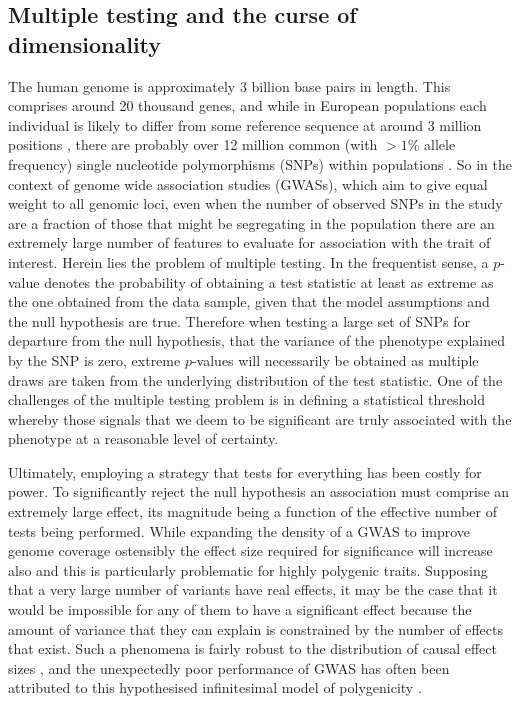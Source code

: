 \subsection{Multiple testing and the curse of dimensionality}

The human genome is approximately 3 billion base pairs in length. This comprises around 20 thousand genes, and while in European populations each individual is likely to differ from some reference sequence at around 3 million positions \citep{Durbin2010}, there are probably over 12 million common (with $>1\%$ allele frequency) single nucleotide polymorphisms (SNPs) within populations \citep{Altshuler2010}. So in the context of genome wide association studies (GWASs), which aim to give equal weight to all genomic loci, even when the number of observed SNPs in the study are a fraction of those that might be segregating in the population there are an extremely large number of features to evaluate for association with the trait of interest. Herein lies the problem of multiple testing. In the frequentist sense, a $p$-value denotes the probability of obtaining a test statistic at least as extreme as the one obtained from the data sample, given that the model assumptions and the null hypothesis are true. Therefore when testing a large set of SNPs for departure from the null hypothesis, that the variance of the phenotype explained by the SNP is zero, extreme $p$-values will necessarily be obtained as multiple draws are taken from the underlying distribution of the test statistic. One of the challenges of the multiple testing problem is in defining a statistical threshold whereby those signals that we deem to be significant are truly associated with the phenotype at a reasonable level of certainty.

Ultimately, employing a strategy that tests for everything has been costly for power. To significantly reject the null hypothesis an association must comprise an extremely large effect, its magnitude being a function of the effective number of tests being performed. While expanding the density of a GWAS to improve genome coverage ostensibly the effect size required for significance will increase also and this is particularly problematic for highly polygenic traits. Supposing that a very large number of variants have real effects, it may be the case that it would be impossible for any of them to have a significant effect because the amount of variance that they can explain is constrained by the number of effects that exist. Such a phenomena is fairly robust to the distribution of causal effect sizes \citep{Daetwyler2008}, and the unexpectedly poor performance of GWAS has often been attributed to this hypothesised infinitesimal model of polygenicity \citep{Park2010}.

